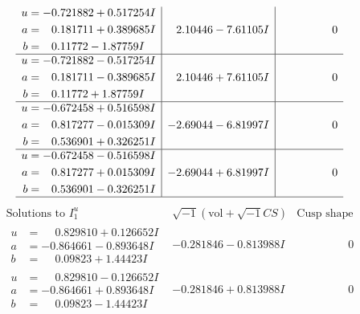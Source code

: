 \documentclass[1p]{elsarticle_modified}
\theoremstyle{definition}
\newcommand{\I}{\sqrt{-1}}
\begin{document}
$$\begin{array}{c|c|c}
\begin{aligned}
u &= -0.721882 + 0.517254 I \\
a &= \phantom{-}0.181711 + 0.389685 I \\
b &= \phantom{-}0.11772 - 1.87759 I\end{aligned}
 & \phantom{-}2.10446 - 7.61105 I & \phantom{-0.000000 } 0 \\ \hline\begin{aligned}
u &= -0.721882 - 0.517254 I \\
a &= \phantom{-}0.181711 - 0.389685 I \\
b &= \phantom{-}0.11772 + 1.87759 I\end{aligned}
 & \phantom{-}2.10446 + 7.61105 I & \phantom{-0.000000 } 0 \\ \hline\begin{aligned}
u &= -0.672458 + 0.516598 I \\
a &= \phantom{-}0.817277 - 0.015309 I \\
b &= \phantom{-}0.536901 + 0.326251 I\end{aligned}
 & -2.69044 - 6.81997 I & \phantom{-0.000000 } 0 \\ \hline\begin{aligned}
u &= -0.672458 - 0.516598 I \\
a &= \phantom{-}0.817277 + 0.015309 I \\
b &= \phantom{-}0.536901 - 0.326251 I\end{aligned}
 & -2.69044 + 6.81997 I & \phantom{-0.000000 } 0\\
 \hline 
 \end{array}$$\newpage$$\begin{array}{c|c|c}  
\text{Solutions to }I^u_{1}& \I (\text{vol} + \sqrt{-1}CS) & \text{Cusp shape}\\
 \hline 
\begin{aligned}
u &= \phantom{-}0.829810 + 0.126652 I \\
a &= -0.864661 - 0.893648 I \\
b &= \phantom{-}0.09823 + 1.44423 I\end{aligned}
 & -0.281846 - 0.813988 I & \phantom{-0.000000 } 0 \\ \hline\begin{aligned}
u &= \phantom{-}0.829810 - 0.126652 I \\
a &= -0.864661 + 0.893648 I \\
b &= \phantom{-}0.09823 - 1.44423 I\end{aligned}
 & -0.281846 + 0.813988 I & \phantom{-0.000000 } 0 \\ \hline\begin{aligned}

\end{aligned}
\end{array}$$
\end{document}
